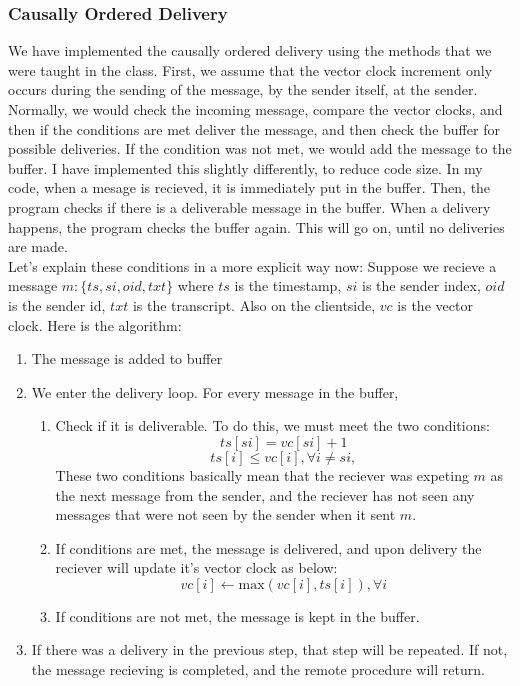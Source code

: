 \documentclass[11pt,reqno]{amsart}
\begin{document}
\subsubsection{Causally Ordered Delivery}
We have implemented the causally ordered delivery using the methods that we were taught in the class. First, we assume that the vector clock increment only occurs during the sending of the message, by the sender itself, at the sender. Normally, we would check the incoming message, compare the vector clocks, and then if the conditions are met deliver the message, and then check the buffer for possible deliveries. If the condition was not met, we would add the message to the buffer. I have implemented this slightly differently, to reduce code size. In my code, when a mesage is recieved, it is immediately put in the buffer. Then, the program checks if there is a deliverable message in the buffer. When a delivery happens, the program checks the buffer again. This will go on, until no deliveries are made. \\
Let's explain these conditions in a more explicit way now: Suppose we recieve a message $m: \{ts,si,oid,txt\}$ where $ts$ is the timestamp, $si$ is the sender index, $oid$ is the sender id, $txt$ is the transcript. Also on the clientside, $vc$ is the vector clock. Here is the algorithm: 
\begin{enumerate}
	\item The message is added to buffer
	\item We enter the delivery loop. For every message in the buffer,
	\begin{enumerate}
		\item Check if it is deliverable. To do this, we must meet the two conditions:
		$$
			ts[si] = vc[si] + 1
		$$
		$$
			ts[i] \leq  vc[i], \forall i \neq si,
		$$
		These two conditions basically mean that the reciever was expeting $m$ as the next message from the sender, and the reciever has not seen any messages that were not seen by the sender when it sent $m$.
		\item If conditions are met, the message is delivered, and upon delivery the reciever will update it's vector clock as below:
		$$
			vc[i] \xleftarrow{} \text{max}(vc[i], ts[i]), \forall i
		$$
		\item If conditions are not met, the message is kept in the buffer.
	\end{enumerate}	
	\item If there was a delivery in the previous step, that step will be repeated. If not, the message recieving is completed, and the remote procedure will return.
\end{enumerate}
\end{document}
